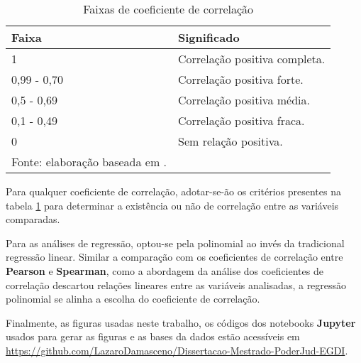 \begin{longtable}[c]{@{}ll@{}}
	\caption{Faixas de coeficiente de correlação}
	\label{tab:faixas-coeficiente-correlacao}\\
	\toprule
	\endfirsthead
	\toprule
	\endhead
	\textbf{Faixa} & \textbf{Significado} \\ \midrule
	1           & Correlação positiva completa. \\ \midrule
	0,99 - 0,70 & Correlação positiva forte.    \\ \midrule
	0,5 - 0,69  & Correlação positiva média.    \\ \midrule
	0,1 - 0,49  & Correlação positiva fraca.    \\ \midrule
	0           & Sem relação positiva.         \\ \bottomrule
	\footnotesize{Fonte: elaboração baseada em \cite{ali2022spearman}.}
\end{longtable}

Para qualquer coeficiente de correlação, adotar-se-ão os critérios presentes na tabela \ref{tab:faixas-coeficiente-correlacao} para determinar a existência ou não de correlação entre as variáveis comparadas.

Para as análises de regressão, optou-se pela polinomial ao invés da tradicional regressão linear. Similar a comparação com os coeficientes de correlação entre \textbf{Pearson} e \textbf{Spearman}, como a abordagem da análise dos coeficientes de correlação descartou relações lineares entre as variáveis analisadas, a regressão polinomial se alinha a escolha do coeficiente de correlação.

Finalmente, as figuras usadas neste trabalho, os códigos dos notebooks \textbf{Jupyter} usados para gerar as figuras e as bases da dados estão acessíveis em \url{https://github.com/LazaroDamasceno/Dissertacao-Mestrado-PoderJud-EGDI}.